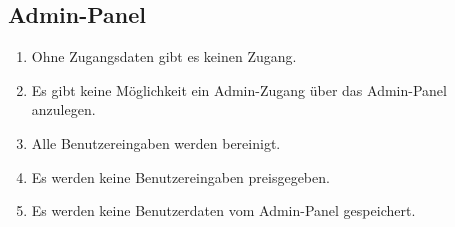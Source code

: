 \subsection{Admin-Panel}

\begin{enumerate}
    \item Ohne Zugangsdaten gibt es keinen Zugang.
    \item Es gibt keine Möglichkeit ein Admin-Zugang über das Admin-Panel anzulegen.
    \item Alle Benutzereingaben werden bereinigt.
    \item Es werden keine Benutzereingaben preisgegeben.
    \item Es werden keine Benutzerdaten vom Admin-Panel gespeichert.
\end{enumerate}